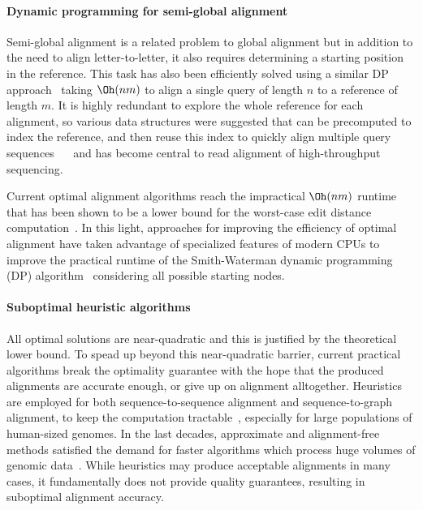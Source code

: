 \paragraph{Dynamic programming for semi-global alignment}
Semi-global alignment is a related problem to global alignment but in addition
to the need to align letter-to-letter, it also requires determining a starting
position in the reference. This task has also been efficiently solved using a
similar DP approach~\cite{sellers1980theory,smith1981identification} taking
$\Oh(nm)$ to align a single query of length $n$ to a reference of length $m$. It
is highly redundant to explore the whole reference for each alignment, so
various data structures were suggested that can be precomputed to index the
reference, and then reuse this index to quickly align multiple query sequences
~\citeyear{pearson1988improved}~\cite{pearson1988improved} and has become
central to read alignment of high-throughput sequencing.

Current optimal alignment algorithms reach the impractical $\Oh(nm)$ runtime
that has been shown to be a lower bound for the worst-case edit distance
computation~\cite{backurs2015edit}. In this light, approaches for improving the
efficiency of optimal alignment have taken advantage of specialized features of
modern CPUs to improve the practical runtime of the Smith-Waterman dynamic
programming (DP) algorithm~\cite{smith_comparison_1981} considering all possible
starting nodes.

\paragraph{Suboptimal heuristic algorithms}
All optimal solutions are near-quadratic and this is justified by the
theoretical lower bound. To spead up beyond this near-quadratic barrier, current
practical algorithms break the optimality guarantee with the hope that the
produced alignments are accurate enough, or give up on alignment alltogether.
Heuristics are employed for both sequence-to-sequence alignment and
sequence-to-graph alignment, to keep the computation
tractable~\cite{altschul_basic_1990,langmead_fast_2012,garrison_variation_2018},
especially for large populations of human-sized genomes. In the last decades,
approximate and alignment-free methods satisfied the demand for faster
algorithms which process huge volumes of genomic
data~\citep{kucherov2019evolution}. While heuristics may produce acceptable
alignments in many cases, it fundamentally does not provide quality guarantees,
resulting in suboptimal alignment accuracy.

